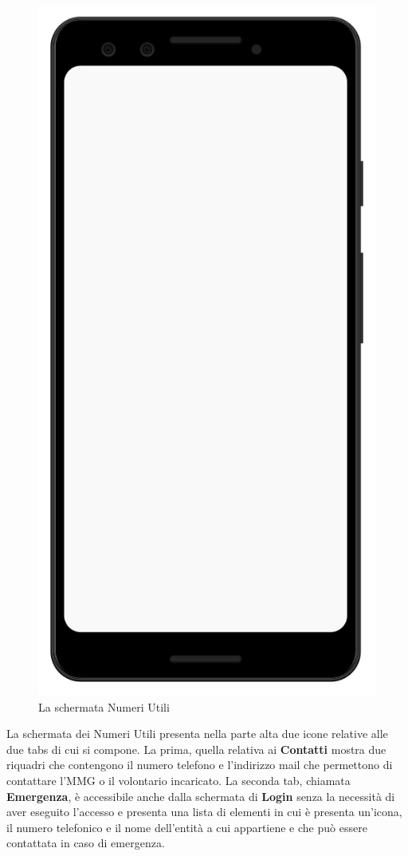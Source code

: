 \documentclass[12pt,a4paper,twoside,openright,titlepage]{book}
\begin{document}
\begin{figure}[H]
\includegraphics[scale = 0.2]{mobile}
\caption{La schermata Numeri Utili}
\end{figure}
La schermata dei Numeri Utili presenta nella parte alta due icone relative alle due tabs di cui si compone. La prima, quella relativa ai \textbf{Contatti} mostra due riquadri che contengono il numero telefono e l'indirizzo mail che permettono di contattare l'MMG o il volontario incaricato. La seconda tab, chiamata \textbf{Emergenza}, è accessibile anche dalla schermata di \textbf{Login} senza la necessità di aver eseguito l'accesso e presenta una lista di elementi in cui è presenta un'icona, il numero telefonico e il nome dell'entità a cui appartiene e che può essere contattata in caso di emergenza.
\end{document}
